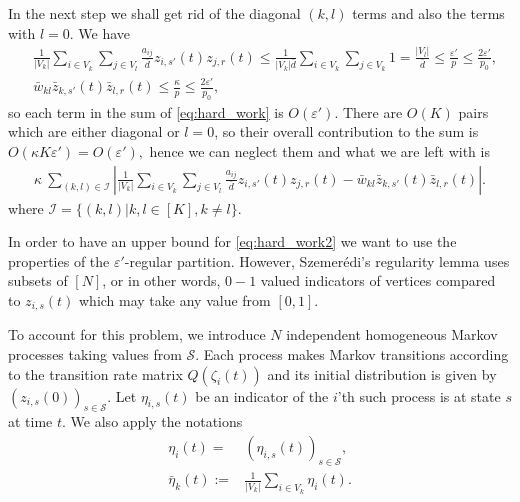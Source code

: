 \documentclass{article}
\newcommand{\1}[1]{{\mathds{1}}_{\left\{#1\right\}}}
\begin{document}
	In the next step we shall get rid of the diagonal $(k,l)$ terms and also the terms with $l=0$. We have
	\begin{align*}
		& \frac{1}{|V_k|}\sum_{i \in V_k}\sum_{j \in V_l} \frac{a_{ij}}{\bar{d}}z_{i,s'}(t)z_{j,r}(t) \leq \frac{1}{\left|V_k \right| \bar{d}}\sum_{i \in V_k}\sum_{j \in V_k} 1=\frac{\left |V_l \right |}{\bar{d}} \leq \frac{\varepsilon'}{p} \leq \frac{2 \varepsilon'}{p_0},\\
		& \bar{w}_{kl}\bar{z}_{k,s'}(t)\bar{z}_{l,r}(t) \leq \frac{\kappa}{p} \leq \frac{2\varepsilon'}{p_0},
	\end{align*}
	so each term in the sum of \eqref{eq:hard_work} is $O \left(\varepsilon' \right).$ There are $O(K)$ pairs which are either diagonal or $l=0$, so their overall contribution to the sum is $O\left(\kappa K \varepsilon' \right)=O\left(\varepsilon' \right),$ hence we can neglect them and what we are left with is
	\begin{align}
		\label{eq:hard_work2}
		\kappa\ \sum_{(k,l) \in \mathcal{I}} \left| \frac{1}{|V_k|}\sum_{i \in V_k}\sum_{j \in V_l} \frac{a_{ij}}{\bar{d}}z_{i,s'}(t)z_{j,r}(t)-\bar{w}_{kl}\bar{z}_{k,s'}(t)\bar{z}_{l,r}(t) \right|.	
	\end{align}
	where $\mathcal{I}=\{(k,l) | k,l \in [K], k \neq l \}$.
	
	In order to have an upper bound for \eqref{eq:hard_work2} we want to use the properties of the $\varepsilon'$-regular partition. However, Szemer\'edi's regularity lemma uses subsets of $[N]$, or in other words, $0-1$ valued indicators of vertices compared to $z_{i,s}(t)$ which may take any value from $[0,1].$
	
	To account for this problem, we introduce $N$ independent homogeneous Markov processes taking values from $\mathcal{S}$. Each process makes Markov transitions according to the transition rate matrix $Q \left(\zeta_{i}(t)\right)$ and its initial distribution is given by $\left(z_{i,s}(0)\right)_{s \in \mathcal{S}}.$ Let $\eta_{i,s}(t)$ be an indicator of the $i$'th such process is at state $s$ at time $t$. We also apply the notations
	\begin{align*}
		\eta_{i}(t)=& \left(\eta_{i,s}(t)\right)_{s \in \mathcal{S}},\\
		\bar{\eta}_{k}(t):=& \frac{1}{\left |V_k \right |}\sum_{i \in V_k}\eta_{i}(t).
	\end{align*}
	
\end{document}
